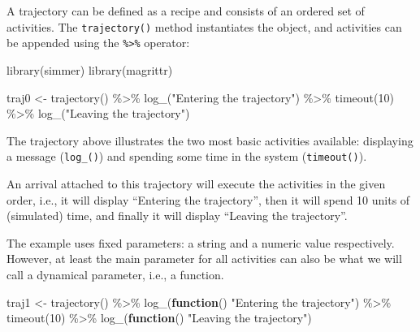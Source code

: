 \documentclass[
]{book}
\newenvironment{Shaded}{\begin{snugshade}}{\end{snugshade}}
\newcommand{\ControlFlowTok}[1]{\textcolor[rgb]{0.13,0.29,0.53}{\textbf{#1}}}
\newcommand{\DecValTok}[1]{\textcolor[rgb]{0.00,0.00,0.81}{#1}}
\newcommand{\FunctionTok}[1]{\textcolor[rgb]{0.00,0.00,0.00}{#1}}
\newcommand{\NormalTok}[1]{#1}
\newcommand{\OtherTok}[1]{\textcolor[rgb]{0.56,0.35,0.01}{#1}}
\newcommand{\SpecialCharTok}[1]{\textcolor[rgb]{0.00,0.00,0.00}{#1}}
\newcommand{\StringTok}[1]{\textcolor[rgb]{0.31,0.60,0.02}{#1}}
\theoremstyle{definition}
\theoremstyle{definition}
\theoremstyle{definition}
\theoremstyle{definition}
\theoremstyle{remark}
\begin{document}
A trajectory can be defined as a recipe and consists of an ordered set of activities. The \texttt{trajectory()} method instantiates the object, and activities can be appended using the \texttt{\%\textgreater{}\%} operator:

\begin{Shaded}
\begin{Highlighting}[]
\FunctionTok{library}\NormalTok{(simmer)}
\FunctionTok{library}\NormalTok{(magrittr)}

\NormalTok{traj0 }\OtherTok{\textless{}{-}} \FunctionTok{trajectory}\NormalTok{() }\SpecialCharTok{\%\textgreater{}\%}
  \FunctionTok{log\_}\NormalTok{(}\StringTok{"Entering the trajectory"}\NormalTok{) }\SpecialCharTok{\%\textgreater{}\%}
  \FunctionTok{timeout}\NormalTok{(}\DecValTok{10}\NormalTok{) }\SpecialCharTok{\%\textgreater{}\%}
  \FunctionTok{log\_}\NormalTok{(}\StringTok{"Leaving the trajectory"}\NormalTok{)}
\end{Highlighting}
\end{Shaded}

The trajectory above illustrates the two most basic activities available: displaying a message (\texttt{log\_()}) and spending some time in the system (\texttt{timeout()}).

An arrival attached to this trajectory will execute the activities in the given order, i.e., it will display ``Entering the trajectory'', then it will spend 10 units of (simulated) time, and finally it will display ``Leaving the trajectory''.

The example uses fixed parameters: a string and a numeric value respectively. However, at least the main parameter for all activities can also be what we will call a dynamical parameter, i.e., a function.

\begin{Shaded}
\begin{Highlighting}[]
\NormalTok{traj1 }\OtherTok{\textless{}{-}} \FunctionTok{trajectory}\NormalTok{() }\SpecialCharTok{\%\textgreater{}\%}
  \FunctionTok{log\_}\NormalTok{(}\ControlFlowTok{function}\NormalTok{() }\StringTok{"Entering the trajectory"}\NormalTok{) }\SpecialCharTok{\%\textgreater{}\%}
  \FunctionTok{timeout}\NormalTok{(}\DecValTok{10}\NormalTok{) }\SpecialCharTok{\%\textgreater{}\%}
  \FunctionTok{log\_}\NormalTok{(}\ControlFlowTok{function}\NormalTok{() }\StringTok{"Leaving the trajectory"}\NormalTok{)}
\end{Highlighting}
\end{Shaded}
\end{document}
